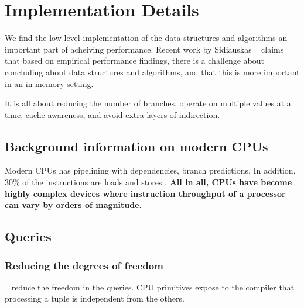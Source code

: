 \chapter{Implementation Details}
\label{chap:Implementation Details}
We find the low-level implementation of the data structures and algorithms an important part of acheiving performance. Recent work by Sidiauskas \ea~\cite{Sidiauskas2014-ef} claims that based on empirical performance findings, there is a challenge about concluding about data structures and algorithms, and that this is more important in an in-memory setting.

It is all about reducing the number of branches, operate on multiple values at a time, cache awareness, and avoid extra layers of indirection.
\newpage

\section{Background information on modern CPUs}
\label{sec:Background information on modern CPUs}
Modern CPUs has pipelining with dependencies, branch predictions. In addition, 30\% of the instructions are loads and stores \cite{Boncz2005-wj}. \textbf{All in all, CPUs have become highly complex devices where instruction throughput of a processor can vary by orders of magnitude}.

\section{Queries}
\label{sec:Queries}

\subsection{Reducing the degrees of freedom}
\label{sub:Reducing the degrees of freedom}
\monetdb~\cite{Boncz2005-wj} reduce the freedom in the queries. CPU primitives expose to the compiler that processing a tuple is independent from the others.

